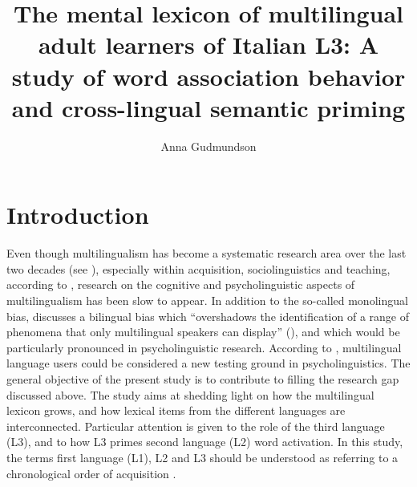 \documentclass[output=paper,colorlinks,citecolor=brown,nonflat]{langsci/langscibook}
\author{Anna Gudmundson	\affiliation{Stockholm University}}
\title{The mental lexicon of multilingual adult learners of Italian L3: A study of word association behavior and cross-lingual semantic priming}
\begin{document}
\maketitle
\newpage

\section{Introduction}\label{sec:gudmundson:1}

Even though multilingualism has become a systematic research area over the last two decades (see \citealt{CenozEtAl2001, DeAngelis2007, GarciaMayo2012, Szubko-Sitarek2015}), especially within acquisition, sociolinguistics and teaching, according to \citet[1]{DeAngelis2007}, research on the cognitive and psycholinguistic aspects of multilingualism has been slow to appear. In addition to the so-called monolingual bias, \citeauthor{DeAngelis2007} discusses a bilingual bias which “overshadows the identification of a range of phenomena that only multilingual speakers can display” (\citeyear[13]{DeAngelis2007}), and which would be particularly pronounced in psycholinguistic research. According to \citet[10]{Szubko-Sitarek2015}, multilingual language users could be considered a new testing ground in psycholinguistics. The general objective of the present study is to contribute to filling the research gap discussed above. The study aims at shedding light on how the multilingual lexicon grows, and how lexical items from the different languages are interconnected. Particular attention is given to the role of the third language (L3), and to how L3 primes second language (L2) word activation. In this study, the terms first language (L1), L2 and L3 should be understood as referring to a chronological order of acquisition \citep{Hammarberg2014}.
\end{document}

